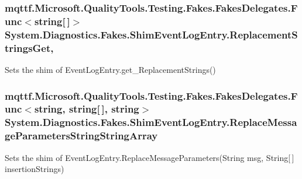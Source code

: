 \hypertarget{class_system_1_1_diagnostics_1_1_fakes_1_1_shim_event_log_entry_ababa14323927d6a4eb96219cdb78ad6a}{
\subsubsection[{Replacement\-Strings\-Get}]{\setlength{\rightskip}{0pt plus 5cm}mqttf.\-Microsoft.\-Quality\-Tools.\-Testing.\-Fakes.\-Fakes\-Delegates.\-Func$<$string\mbox{[}$\,$\mbox{]}$>$ System.\-Diagnostics.\-Fakes.\-Shim\-Event\-Log\-Entry.\-Replacement\-Strings\-Get\hspace{0.3cm}{\ttfamily [get]}, {\ttfamily [set]}}}\label{class_system_1_1_diagnostics_1_1_fakes_1_1_shim_event_log_entry_ababa14323927d6a4eb96219cdb78ad6a}


Sets the shim of Event\-Log\-Entry.\-get\-\_\-\-Replacement\-Strings()

\hypertarget{class_system_1_1_diagnostics_1_1_fakes_1_1_shim_event_log_entry_a9256c7e2f24f8125e2093392ff138c6b}{
\subsubsection[{Replace\-Message\-Parameters\-String\-String\-Array}]{\setlength{\rightskip}{0pt plus 5cm}mqttf.\-Microsoft.\-Quality\-Tools.\-Testing.\-Fakes.\-Fakes\-Delegates.\-Func$<$string, string\mbox{[}$\,$\mbox{]}, string$>$ System.\-Diagnostics.\-Fakes.\-Shim\-Event\-Log\-Entry.\-Replace\-Message\-Parameters\-String\-String\-Array\hspace{0.3cm}{\ttfamily [set]}}}\label{class_system_1_1_diagnostics_1_1_fakes_1_1_shim_event_log_entry_a9256c7e2f24f8125e2093392ff138c6b}


Sets the shim of Event\-Log\-Entry.\-Replace\-Message\-Parameters(\-String msg, String\mbox{[}$\,$\mbox{]} insertion\-Strings)

